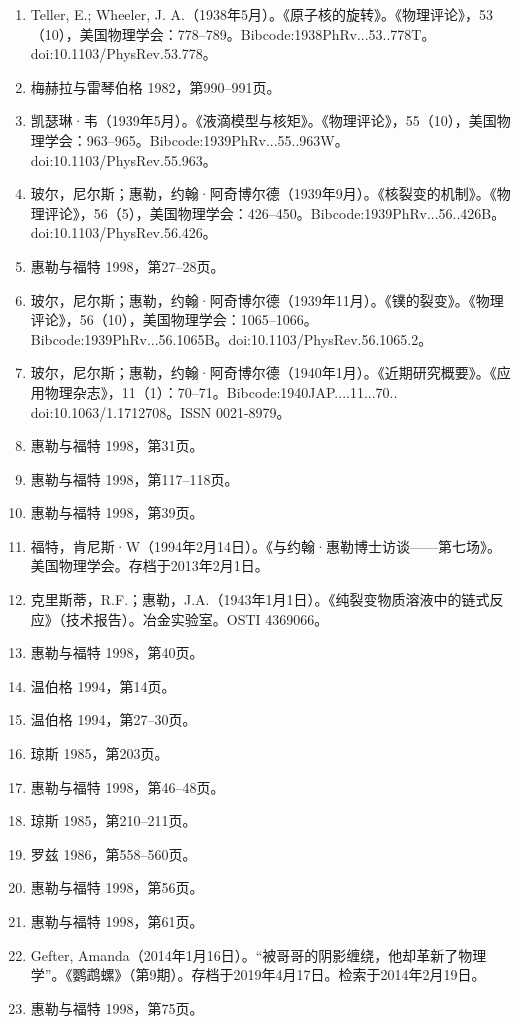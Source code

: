 \begin{enumerate}
\item Teller, E.; Wheeler, J. A.（1938年5月）。《原子核的旋转》。《物理评论》，53（10），美国物理学会：778–789。Bibcode:1938PhRv...53..778T。doi:10.1103/PhysRev.53.778。
\item 梅赫拉与雷琴伯格 1982，第990–991页。
\item 凯瑟琳·韦（1939年5月）。《液滴模型与核矩》。《物理评论》，55（10），美国物理学会：963–965。Bibcode:1939PhRv...55..963W。doi:10.1103/PhysRev.55.963。
\item 玻尔，尼尔斯；惠勒，约翰·阿奇博尔德（1939年9月）。《核裂变的机制》。《物理评论》，56（5），美国物理学会：426–450。Bibcode:1939PhRv...56..426B。doi:10.1103/PhysRev.56.426。
\item 惠勒与福特 1998，第27–28页。
\item 玻尔，尼尔斯；惠勒，约翰·阿奇博尔德（1939年11月）。《镤的裂变》。《物理评论》，56（10），美国物理学会：1065–1066。Bibcode:1939PhRv...56.1065B。doi:10.1103/PhysRev.56.1065.2。
\item 玻尔，尼尔斯；惠勒，约翰·阿奇博尔德（1940年1月）。《近期研究概要》。《应用物理杂志》，11（1）：70–71。Bibcode:1940JAP....11...70.. doi:10.1063/1.1712708。ISSN 0021-8979。
\item 惠勒与福特 1998，第31页。
\item 惠勒与福特 1998，第117–118页。
\item 惠勒与福特 1998，第39页。
\item 福特，肯尼斯·W（1994年2月14日）。《与约翰·惠勒博士访谈——第七场》。美国物理学会。存档于2013年2月1日。
\item 克里斯蒂，R.F.；惠勒，J.A.（1943年1月1日）。《纯裂变物质溶液中的链式反应》（技术报告）。冶金实验室。OSTI 4369066。
\item 惠勒与福特 1998，第40页。
\item 温伯格 1994，第14页。
\item 温伯格 1994，第27–30页。
\item 琼斯 1985，第203页。
\item 惠勒与福特 1998，第46–48页。
\item 琼斯 1985，第210–211页。
\item 罗兹 1986，第558–560页。
\item 惠勒与福特 1998，第56页。
\item 惠勒与福特 1998，第61页。
\item Gefter, Amanda（2014年1月16日）。“被哥哥的阴影缠绕，他却革新了物理学”。《鹦鹉螺》（第9期）。存档于2019年4月17日。检索于2014年2月19日。
\item 惠勒与福特 1998，第75页。

\end{enumerate}
